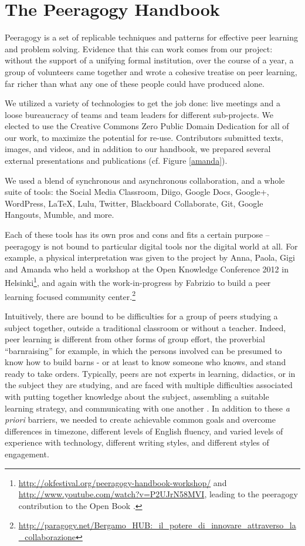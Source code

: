 \documentclass{acm_proc_article-sp}
\begin{document}
\section{The Peeragogy Handbook}

Peeragogy is a set of replicable techniques and patterns for effective
peer learning and problem solving.  Evidence that this can work comes
from our project: without the support of a unifying formal
institution, over the course of a year, a group of volunteers came
together and wrote a cohesive treatise on peer learning, far richer
than what any one of these people could have produced alone.

We utilized a variety of technologies to get the job done: live
meetings and a loose bureaucracy of teams and team leaders for
different sub-projects.  We elected to use the Creative Commons Zero
Public Domain Dedication for all of our work, to maximize the
potential for re-use.  Contributors submitted texts, images, and
videos, and in addition to our handbook, we prepared several external
presentations and publications (cf. Figure \ref{amanda}).

We used a blend of synchronous and asynchronous collaboration, and a
whole suite of tools: the Social Media Classroom, Diigo, Google Docs,
Google+, WordPress, LaTeX, Lulu, Twitter, Blackboard Collaborate, Git,
Google Hangouts, Mumble, and more.  

Each of these tools has its own pros and cons and fits a certain
purpose -- peeragogy is not bound to particular digital tools nor the
digital world at all.  For example, a physical interpretation was
given to the project by Anna, Paola, Gigi and Amanda who held a
workshop at the Open Knowledge Conference 2012 in Helsinki\footnote{
  \url{http://okfestival.org/peeragogy-handbook-workshop/} and
  \url{http://www.youtube.com/watch?v=P2UJrN58MVI}, leading to the
  peeragogy contribution to the Open Book \cite{PeeragogyinAction}.},
and again with the work-in-progress by Fabrizio to build a peer learning focused community center.\footnote{\url{http://paragogy.net/Bergamo_HUB:_il_potere_di_innovare_attraverso_la_collaborazione}}

Intuitively, there are bound to be difficulties for a group of peers studying a subject together, outside a traditional classroom or without a teacher. Indeed, peer learning is different from other forms of group effort, the proverbial ``barnraising'' for example, in which the persons involved can be presumed to know how to build barns - or at least to know someone who knows, and stand ready to take orders.  Typically, peers are not experts in learning, didactics, or in the subject they are studying, and are faced with multiple difficulties associated with putting together knowledge about the subject, assembling a suitable learning strategy, and communicating with one another \cite{paragogy}.  In addition to these \emph{a priori} barriers, we needed to create achievable common goals and overcome differences in timezone, different levels of English fluency, and varied levels of experience with technology, different writing styles, and different styles of engagement.
\end{document}
